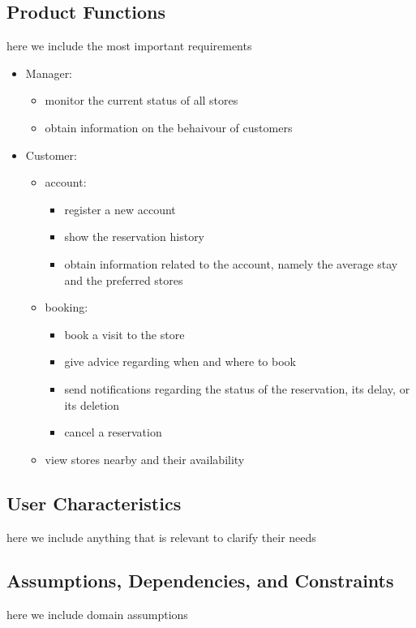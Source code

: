 \subsection{Product Functions}
here we include the most important requirements

\begin{itemize}
    \item Manager:
    \begin{itemize}
        \item monitor the current status of all stores
        \item obtain information on the behaivour of customers
    \end{itemize}
    \item Customer:
    \begin{itemize}
        \item account:
        \begin{itemize}
            \item register a new account
            \item show the reservation history
            \item obtain information related to the account, namely the average stay and the preferred stores
        \end{itemize}
        \item booking:
        \begin{itemize}
            \item book a visit to the store
            \item give advice regarding when and where to book
            \item send notifications regarding the status of the reservation, its delay, or its deletion
            \item cancel a reservation
        \end{itemize}
        \item view stores nearby and their availability
    \end{itemize}
\end{itemize}
\subsection{User Characteristics}
here we include anything that is relevant to clarify their needs

\subsection{Assumptions, Dependencies, and Constraints}
here we include domain assumptions 